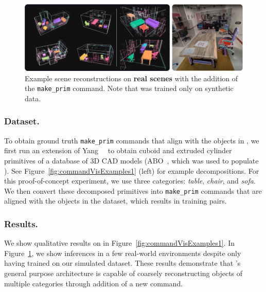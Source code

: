 \begin{figure}[t]
    \centering
    \includegraphics[width=\textwidth]{figs/real_scenes.jpg}
    \caption{Example scene reconstructions on \textbf{real scenes} with the addition of the \texttt{make\_prim} command. Note that \METHOD{} was trained only on synthetic data.}
    \label{fig:extensions}
\end{figure}

\subsubsection{Dataset.}
To obtain ground truth \texttt{make\_prim} commands that align with the objects in \DatasetName, we first run an extension of Yang~\etal~\cite{yang2021unsupervised} to obtain cuboid and extruded cylinder primitives of a database of 3D CAD models (ABO~\cite{collins2022abo}, which was used to populate \DatasetName). See Figure~\ref{fig:commandVisExamples1} (left) for example decompositions. For this proof-of-concept experiment, we use three categories: \textit{table}, \textit{chair}, and \textit{sofa}. We then convert these decomposed primitives into \texttt{make\_prim} commands that are aligned with the objects in the dataset, which results in training pairs. 


\subsubsection{Results.} 
We show qualitative results on \DatasetName{} in Figure~\ref{fig:commandVisExamples1}.
In Figure~\ref{fig:extensions},
we show inferences in a few real-world environments
despite only having trained on our simulated dataset.
These results demonstrate that \METHOD{}'s general purpose architecture is capable of coarsely reconstructing objects of multiple categories through addition of a new command.




